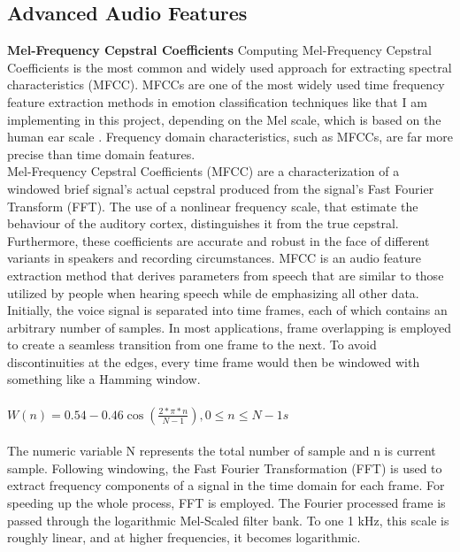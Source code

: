 \documentclass[11pt,a4paper]{article}
\begin{document}
	\subsection{Advanced Audio Features}
	\textbf{\textbf{Mel-Frequency Cepstral Coefficients}}
	Computing Mel-Frequency Cepstral Coefficients is the most common and widely used approach for extracting spectral characteristics (MFCC). MFCCs are one of the most widely used time frequency feature extraction methods in emotion classification techniques like that I am implementing in this project, depending on the Mel scale, which is based on the human ear scale \cite{tsuji2021contact}. Frequency domain characteristics, such as MFCCs, are far more precise than time domain features.\\ Mel-Frequency Cepstral Coefficients (MFCC) are a characterization of a windowed brief signal's actual cepstral produced from the signal's Fast Fourier Transform (FFT). The use of a nonlinear frequency scale, that estimate the behaviour of the auditory cortex, distinguishes it from the true cepstral. Furthermore, these coefficients are accurate and robust in the face of different variants in speakers and recording circumstances. MFCC is an audio feature extraction method that derives parameters from speech that are similar to those utilized by people when hearing speech \cite{paul2021bengali} while de emphasizing all other data. Initially, the voice signal is separated into time frames, each of which contains an arbitrary number of samples. In most applications, frame overlapping is employed to create a seamless transition from one frame to the next. To avoid discontinuities at the edges, every time frame would then be windowed with something like a Hamming window. \\ \\
	$W(n) = 0.54 - 0.46 \cos (\frac{2*\pi*n}{N-1}), 0\le n \le N-1s$ \\ \\
    The numeric variable N represents the total number of sample and n is current sample. Following windowing, the Fast Fourier Transformation (FFT) is used to extract frequency components of a signal in the time domain for each frame.
    For speeding up the whole process, FFT is employed. The Fourier processed frame is passed through the logarithmic Mel-Scaled filter bank. To one 1 kHz, this scale is roughly linear, and at higher frequencies, it becomes logarithmic.\\
\end{document}
